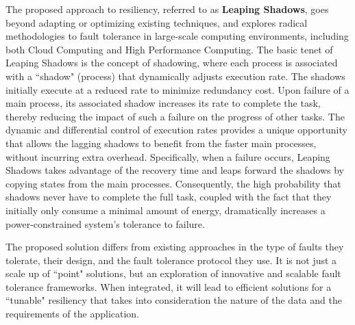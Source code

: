 The proposed approach to resiliency, referred to as \textbf{Leaping Shadows}, goes beyond adapting or optimizing existing techniques, and explores radical methodologies to fault tolerance in large-scale computing environments, including both Cloud Computing and High Performance Computing. The basic tenet of Leaping Shadows is the concept of shadowing, where each process is associated with a ``shadow" (process) that dynamically adjusts execution rate. The shadows initially execute at a reduced rate to minimize redundancy cost. Upon failure of a main process, its associated shadow increases its rate to complete the task, thereby reducing the impact of such a failure on the progress of other tasks. The dynamic and differential control of execution rates provides a unique opportunity that allows the lagging shadows to benefit from the faster main processes, without incurring extra overhead. Specifically, when a failure occurs, Leaping Shadows takes advantage of the recovery time and leaps forward the shadows by copying states from the main processes. Consequently, the high probability that shadows never have to complete the full task, coupled with the fact that they initially only consume a minimal amount of energy, dramatically increases a power-constrained system’s tolerance to failure.

The proposed solution differs from existing approaches in the type of faults they tolerate, their design, and the fault tolerance protocol they use. It is not just a scale up of  ``point" solutions, but an exploration of innovative and scalable fault tolerance frameworks. When integrated, it will lead to efficient solutions for a ``tunable" resiliency that takes into consideration the nature of the data and the requirements of the application.

